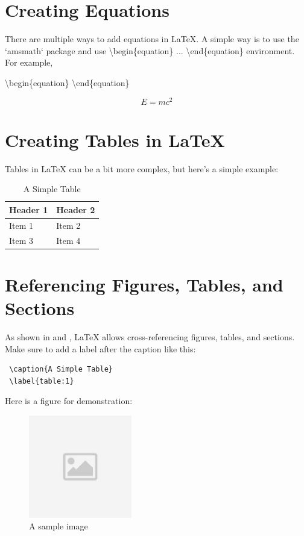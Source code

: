 \documentclass[11pt]{article}
\begin{document}
\section{Creating Equations}

There are multiple ways to add equations in \LaTeX{}. A simple way is to use the `amsmath` package and use \textbackslash begin\{equation\} ... \textbackslash end\{equation\} environment. For example,

\textbackslash begin\{equation\}
\textbackslash end\{equation\}

\begin{equation}
  E = mc^2
\end{equation}

\section{Creating Tables in \LaTeX{}}
Tables in \LaTeX{} can be a bit more complex, but here's a simple example:

\begin{table}[h]
  \centering
  \begin{tabular}{|l|l|}
    \hline
    \textbf{Header 1} & \textbf{Header 2} \\
    \hline
    Item 1            & Item 2            \\
    Item 3            & Item 4            \\
    \hline
  \end{tabular}
  \caption{A Simple Table}
  \label{table:1}
\end{table}

\section{Referencing Figures, Tables, and Sections}
As shown in  and , \LaTeX{} allows cross-referencing figures, tables, and sections. Make sure to add a label after the caption like this:

\begin{verbatim}
 \caption{A Simple Table}
 \label{table:1}
\end{verbatim}

Here is a figure for demonstration:

\begin{figure}[h]
  \centering
  \includegraphics[width=0.4\textwidth]{assets/placeholder.jpg}
  \caption{A sample image}
  \label{fig:1}
\end{figure}
\end{document}
